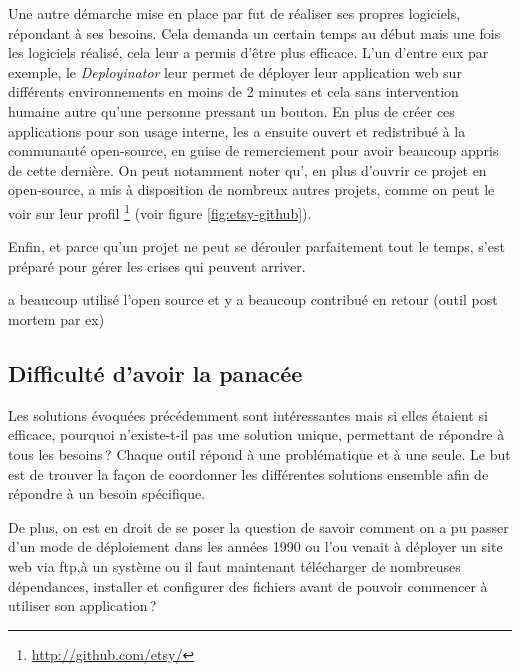 Une autre démarche mise en place par \etsy{} fut de réaliser ses propres logiciels, répondant à ses besoins. Cela demanda un certain temps au début mais une fois les logiciels réalisé, cela leur a permis d'être plus efficace. L'un d'entre eux par exemple, le \emph{Deployinator} leur permet de déployer leur application web sur différents environnements en moins de 2 minutes et cela sans intervention humaine autre qu'une personne pressant un bouton. En plus de créer ces applications pour son usage interne, \etsy{} les a ensuite ouvert et redistribué à la communauté open-source, en guise de remerciement pour avoir beaucoup appris de cette dernière. On peut notamment noter qu'\etsy, en plus d'ouvrir ce projet en open-source, a mis à disposition de nombreux autres projets, comme on peut le voir sur leur profil \github\footnote{ \url{http://github.com/etsy/}} (voir figure \ref{fig:etsy-github}).


Enfin, et parce qu'un projet ne peut se dérouler parfaitement tout le temps, \etsy{} s'est préparé pour gérer les crises qui peuvent arriver. 

a beaucoup utilisé l'open source et y a beaucoup contribué en retour (outil post mortem par ex) %


\subsection{Difficulté d'avoir la panacée}

Les solutions évoquées précédemment sont intéressantes mais si elles étaient si efficace, pourquoi n'existe-t-il pas une solution unique, permettant de répondre à tous les besoins ? Chaque outil répond à une problématique et à une seule. Le but est de trouver la façon de coordonner les différentes solutions ensemble afin de répondre à un besoin spécifique.

De plus, on est en droit de se poser la question de savoir comment on a pu passer d'un mode de déploiement dans les années 1990 ou l'ou venait à déployer un site web via \gls{ftp},à un système ou il faut maintenant télécharger de nombreuses dépendances, installer et configurer des fichiers avant de pouvoir commencer à utiliser son application ?

